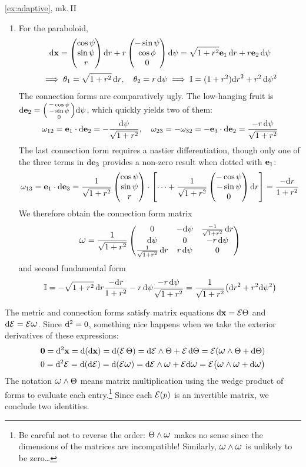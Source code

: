 \begin{examples*}{\ref{ex:adaptive}, mk.\,II}{}
\begin{enumerate}
  	\item For the paraboloid,
  	\begin{gather*}
	  	\mathrm{d}{\mathbf{x}}=\begin{pmatrix}\cos\psi\\\sin\psi\\r\end{pmatrix}{\mathrm{d}r} +r\begin{pmatrix}-\sin\psi\\\cos\phi\\0\end{pmatrix}\mathrm{d}\psi =\sqrt{1+r^2}{\mathbf{e}}_1\,{\mathrm{d} r}+r{\mathbf{e}}_2\,\mathrm{d}\psi\\[2pt]
	  	\implies \theta_1=\sqrt{1+r^2}\,{\mathrm{d} r},\quad \theta_2=r\,\mathrm{d}\psi \implies \mathrm{I}=(1+r^2){\mathrm{d} r}^2+r^2\,\mathrm{d}\psi^2
  	\end{gather*}
  	The connection forms are comparatively ugly. The low-hanging fruit is $\mathrm{d}{\mathbf{e}}_2=\smash[b]{\left(\begin{smallmatrix}-\cos\psi\\-\sin\psi\\0\end{smallmatrix}\right)}\mathrm{d}\psi$, which quickly yields two of them:
  	\[
  		\omega_{12}={\mathbf{e}}_1\cdot\mathrm{d}{\mathbf{e}}_2=-\frac{\mathrm{d}\psi}{\sqrt{1+r^2}},\quad \omega_{23}=-\omega_{32}=-{\mathbf{e}}_3\cdot\mathrm{d}{\mathbf{e}}_2=\frac{-r\,\mathrm{d}\psi}{\sqrt{1+r^2}}
  	\]
  	The last connection form requires a nastier differentiation, though only one of the three terms in $\mathrm{d}{\mathbf{e}}_3$ provides a non-zero result when dotted with ${\mathbf{e}}_1$:
  	\[
  		\omega_{13}={\mathbf{e}}_1\cdot\mathrm{d}{\mathbf{e}}_3=\frac 1{\sqrt{1+r^2}}\begin{pmatrix}\cos\psi\\\sin\psi\\r\end{pmatrix}\cdot\left[\cdots+\frac 1{\sqrt{1+r^2}}\begin{pmatrix}-\cos\psi\\-\sin\psi\\0\end{pmatrix}{\mathrm{d}r}\right] =\frac{-{\mathrm{d} r}}{1+r^2}
  	\]
  	We therefore obtain the connection form matrix
  	\[
  		\lomega=\frac 1{\sqrt{1+r^2}}
	  	\begin{pmatrix}
				0&-\D\psi&\frac{-1}{\sqrt{1+r^2}}\,\dr\\
				\D\psi&0&-r\,\D\psi\\
				\frac 1{\sqrt{1+r^2}}\,\dr&r\,\D\psi&0
			\end{pmatrix}
		\]
		and second fundamental form
		\[
			\mathbb{I}=-\sqrt{1+r^2}\,{\mathrm{d} r}\frac{-{\mathrm{d} r}}{1+r^2} -r\,\mathrm{d}\psi\frac{-r\,\mathrm{d}\psi}{\sqrt{1+r^2}} =\frac 1{\sqrt{1+r^2}}\bigl({\mathrm{d} r}^2+r^2\mathrm{d}\psi^2\bigr)
		\]
	\end{enumerate}
\end{examples*}



The metric and connection forms satisfy matrix equations $\mathrm{d}{\mathbf{x}}=\mathcal{E}\Theta$ and $\D\cE=\cE\lomega$. Since $\mathrm{d}^2=0$, something nice happens when we take the exterior derivatives of these expressions:
\begin{gather*}
	\V0=\D^2\vx=\D(\dvx)=\D(\cE\,\Theta)=\D \cE\wedge\Theta+\cE\,\D\Theta =\cE(\lomega\wedge\Theta+\D\Theta)\\
	0=\D^2 \cE=\D(\D \cE)=\D(\cE\lomega)=\D \cE\wedge\lomega+\cE\D\lomega = \cE\bigl(\lomega\wedge\lomega+\D\lomega\bigr)
\end{gather*}
The notation $\lomega\wedge\Theta$ means matrix multiplication using the wedge product of forms to evaluate each entry.\footnote{Be careful not to reverse the order: $\Theta\wedge\lomega$ makes no sense since the dimensions of the matrices are incompatible! Similarly, $\lomega\wedge\lomega$ is unlikely to be zero\ldots} Since each $\mathcal{E}(p)$ is an invertible matrix, we conclude two identities. 


